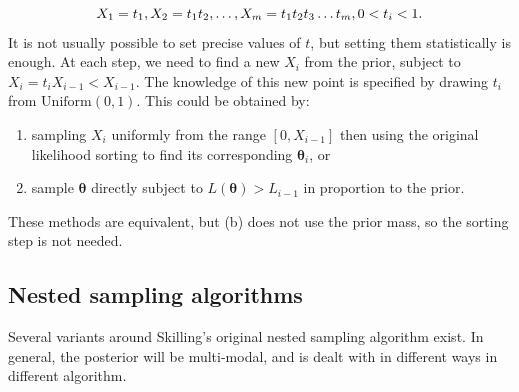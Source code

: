 \documentclass{article}
\begin{document}
\begin{equation}
  X_1 = t_1, X_2 = t_1t_2, \dots, X_m = t_1t_2t_3\dots t_m, 0<t_i<1\textrm.
\end{equation}
%
It is not usually possible to set precise values of $t$, but setting them statistically is enough. At each step, we need to find a new $X_i$ from the prior, subject to $X_i = t_i X_{i-1}<X_{i-1}$. The knowledge of this new point is specified by drawing $t_i$ from $\textrm{Uniform}(0, 1)$. This could be obtained by:
\begin{enumerate}
  \item sampling $X_i$ uniformly from the range $[0, X_{i-1}]$ then using the original likelihood sorting to find its corresponding $\bm\theta_i$, or
  \item sample $\bm\theta$ directly subject to $L(\bm\theta)>L_{i-1}$ in proportion to the prior.
\end{enumerate}

These methods are equivalent, but (b) does not use the prior mass, so the sorting step is not needed.

\subsection{Nested sampling algorithms}

Several variants around Skilling's original nested sampling algorithm exist. In general, the posterior will be multi-modal, and is dealt with in different ways in different algorithm. 
\end{document}
